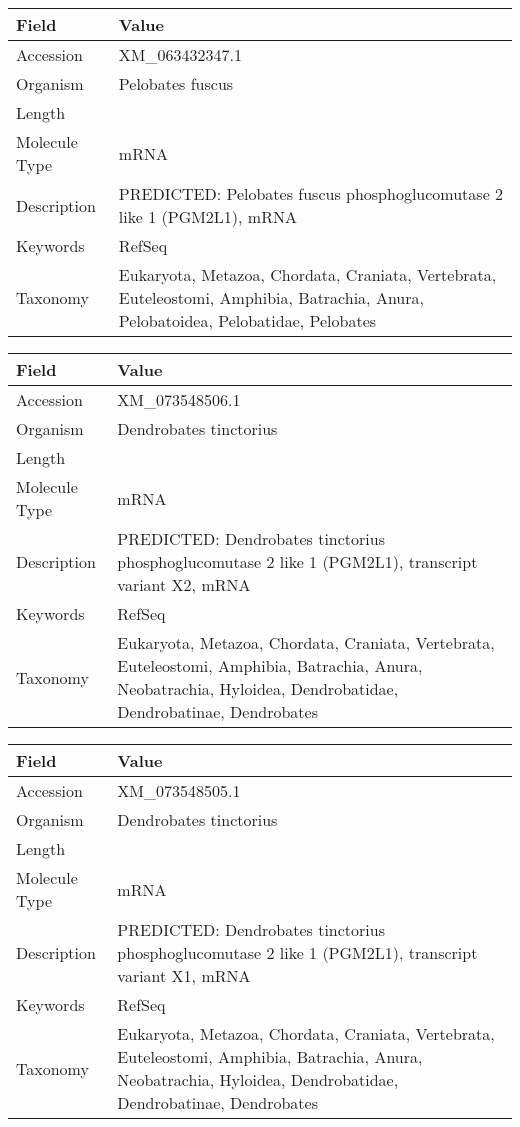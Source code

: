 \documentclass[10pt]{article}
\begin{document}
\vspace{1em}
{\footnotesize
\begin{longtable}{>{\raggedright\arraybackslash}p{4.5cm} >{\raggedright\arraybackslash}p{11.5cm}}
\textbf{Field} & \textbf{Value} \\
\hline
Accession & XM\_063432347.1 \\
Organism & Pelobates fuscus \\
Length & 2355 \\
Molecule Type & mRNA \\
Description & PREDICTED: Pelobates fuscus phosphoglucomutase 2 like 1 (PGM2L1), mRNA \\
Keywords & RefSeq \\
Taxonomy & Eukaryota, Metazoa, Chordata, Craniata, Vertebrata, Euteleostomi, Amphibia, Batrachia, Anura, Pelobatoidea, Pelobatidae, Pelobates \\
\end{longtable}
}

\vspace{1em}
{\footnotesize
\begin{longtable}{>{\raggedright\arraybackslash}p{4.5cm} >{\raggedright\arraybackslash}p{11.5cm}}
\textbf{Field} & \textbf{Value} \\
\hline
Accession & XM\_073548506.1 \\
Organism & Dendrobates tinctorius \\
Length & 6449 \\
Molecule Type & mRNA \\
Description & PREDICTED: Dendrobates tinctorius phosphoglucomutase 2 like 1 (PGM2L1), transcript variant X2, mRNA \\
Keywords & RefSeq \\
Taxonomy & Eukaryota, Metazoa, Chordata, Craniata, Vertebrata, Euteleostomi, Amphibia, Batrachia, Anura, Neobatrachia, Hyloidea, Dendrobatidae, Dendrobatinae, Dendrobates \\
\end{longtable}
}

\vspace{1em}
{\footnotesize
\begin{longtable}{>{\raggedright\arraybackslash}p{4.5cm} >{\raggedright\arraybackslash}p{11.5cm}}
\textbf{Field} & \textbf{Value} \\
\hline
Accession & XM\_073548505.1 \\
Organism & Dendrobates tinctorius \\
Length & 6508 \\
Molecule Type & mRNA \\
Description & PREDICTED: Dendrobates tinctorius phosphoglucomutase 2 like 1 (PGM2L1), transcript variant X1, mRNA \\
Keywords & RefSeq \\
Taxonomy & Eukaryota, Metazoa, Chordata, Craniata, Vertebrata, Euteleostomi, Amphibia, Batrachia, Anura, Neobatrachia, Hyloidea, Dendrobatidae, Dendrobatinae, Dendrobates \\
\end{longtable}
}
\end{document}
